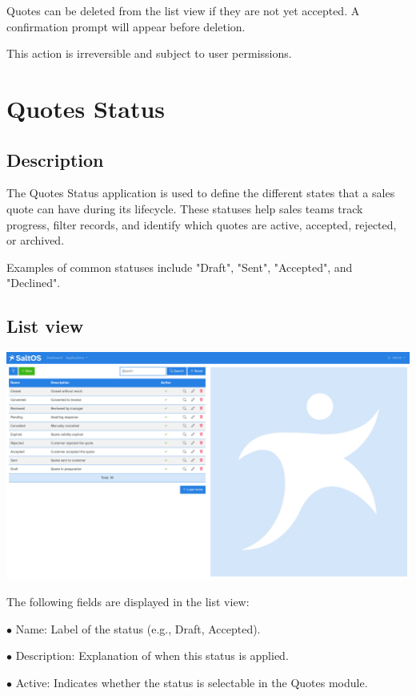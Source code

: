 \documentclass[a4paper]{article}
\begin{document}
Quotes can be deleted from the list view if they are not yet accepted.
A confirmation prompt will appear before deletion.

This action is irreversible and subject to user permissions.


\hypertarget{toc76}{}
\section{Quotes Status}

\hypertarget{toc77}{}
\subsection{Description}

The Quotes Status application is used to define the different states that a sales quote can have during its lifecycle.
These statuses help sales teams track progress, filter records, and identify which quotes are active, accepted, rejected, or archived.

Examples of common statuses include "Draft", "Sent", "Accepted", and "Declined".

\hypertarget{toc78}{}
\subsection{List view}

\begin{center}\includegraphics[width=1\textwidth]{../ujest/snaps/test-screenshots-js-screenshots-crm-quotes-status-list-en-us-1-snap.png}\end{center}

The following fields are displayed in the list view:

\begin{compactitem}
\item[\color{myblue}$\bullet$] Name: Label of the status (e.g., Draft, Accepted).
\item[\color{myblue}$\bullet$] Description: Explanation of when this status is applied.
\item[\color{myblue}$\bullet$] Active: Indicates whether the status is selectable in the Quotes module.
\end{compactitem}
\end{document}
